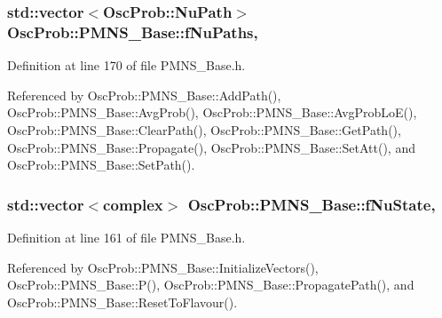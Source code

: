 \subsubsection[{\texorpdfstring{f\+Nu\+Paths}{fNuPaths}}]{\setlength{\rightskip}{0pt plus 5cm}std\+::vector$<${\bf Osc\+Prob\+::\+Nu\+Path}$>$ Osc\+Prob\+::\+P\+M\+N\+S\+\_\+\+Base\+::f\+Nu\+Paths\hspace{0.3cm}{\ttfamily [protected]}, {\ttfamily [inherited]}}\hypertarget{classOscProb_1_1PMNS__Base_a69db9d57e12fc7cbe0431bc6c18fac93}{}\label{classOscProb_1_1PMNS__Base_a69db9d57e12fc7cbe0431bc6c18fac93}


Definition at line 170 of file P\+M\+N\+S\+\_\+\+Base.\+h.



Referenced by Osc\+Prob\+::\+P\+M\+N\+S\+\_\+\+Base\+::\+Add\+Path(), Osc\+Prob\+::\+P\+M\+N\+S\+\_\+\+Base\+::\+Avg\+Prob(), Osc\+Prob\+::\+P\+M\+N\+S\+\_\+\+Base\+::\+Avg\+Prob\+Lo\+E(), Osc\+Prob\+::\+P\+M\+N\+S\+\_\+\+Base\+::\+Clear\+Path(), Osc\+Prob\+::\+P\+M\+N\+S\+\_\+\+Base\+::\+Get\+Path(), Osc\+Prob\+::\+P\+M\+N\+S\+\_\+\+Base\+::\+Propagate(), Osc\+Prob\+::\+P\+M\+N\+S\+\_\+\+Base\+::\+Set\+Att(), and Osc\+Prob\+::\+P\+M\+N\+S\+\_\+\+Base\+::\+Set\+Path().

\subsubsection[{\texorpdfstring{f\+Nu\+State}{fNuState}}]{\setlength{\rightskip}{0pt plus 5cm}std\+::vector$<${\bf complex}$>$ Osc\+Prob\+::\+P\+M\+N\+S\+\_\+\+Base\+::f\+Nu\+State\hspace{0.3cm}{\ttfamily [protected]}, {\ttfamily [inherited]}}\hypertarget{classOscProb_1_1PMNS__Base_ad38a7107c3ab393591fd5ba21658300b}{}\label{classOscProb_1_1PMNS__Base_ad38a7107c3ab393591fd5ba21658300b}


Definition at line 161 of file P\+M\+N\+S\+\_\+\+Base.\+h.



Referenced by Osc\+Prob\+::\+P\+M\+N\+S\+\_\+\+Base\+::\+Initialize\+Vectors(), Osc\+Prob\+::\+P\+M\+N\+S\+\_\+\+Base\+::\+P(), Osc\+Prob\+::\+P\+M\+N\+S\+\_\+\+Base\+::\+Propagate\+Path(), and Osc\+Prob\+::\+P\+M\+N\+S\+\_\+\+Base\+::\+Reset\+To\+Flavour().

